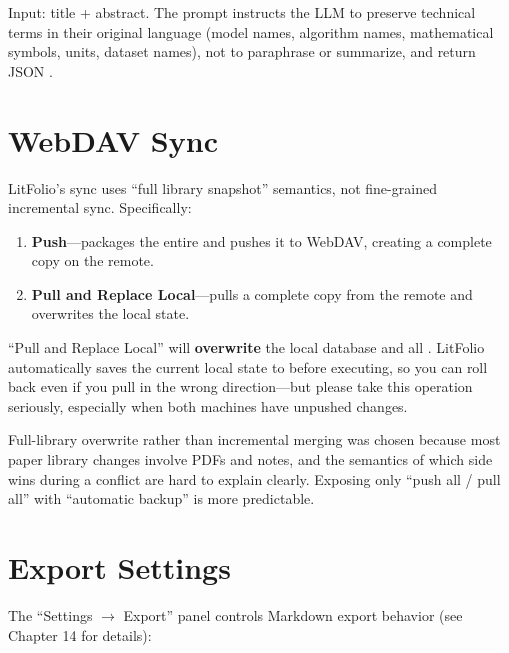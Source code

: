 Input: title + abstract. The prompt instructs the LLM to preserve technical terms in
their original language (model names, algorithm names, mathematical symbols, units,
dataset names), not to paraphrase or summarize, and return JSON
.

\section{WebDAV Sync}


LitFolio's sync uses ``full library snapshot'' semantics, not fine-grained incremental
sync. Specifically:

\begin{enumerate}
  \item \textbf{Push}---packages the entire  and
    pushes it to WebDAV, creating a complete copy on the remote.
  \item \textbf{Pull and Replace Local}---pulls a complete copy from the remote and
    overwrites the local state.
\end{enumerate}

\begin{warnbox}
``Pull and Replace Local'' will \textbf{overwrite} the local database and all
. LitFolio automatically saves the current local state to
 before executing, so you can roll back even if you
pull in the wrong direction---but please take this operation seriously, especially when
both machines have unpushed changes.
\end{warnbox}

Full-library overwrite rather than incremental merging was chosen because
most paper library changes involve PDFs and notes, and the semantics of which
side wins during a conflict are hard to explain clearly. Exposing only ``push all /
pull all'' with ``automatic backup'' is more predictable.

\section{Export Settings}

The ``Settings $\rightarrow$ Export'' panel controls Markdown export behavior (see
Chapter 14 for details):

